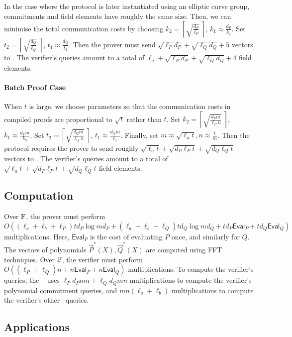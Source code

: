 In the case where the protocol is later instantiated using an elliptic curve group, commitments and field elements have roughly the same size. Then, we can minimise the total communication costs by choosing $k_2 =\left\lceil \sqrt{\frac{d_P }{\ell_P }} ~\right\rceil$, $k_1 \approx \frac{d_P }{k_2}$. Set $t_2= \left\lceil \sqrt{\frac{d_Q}{\ell_Q}} ~\right\rceil$, $t_1 \approx \frac{d_Q }{t_2}$. Then the prover must send $\sqrt{\ell_P d_P}+\sqrt{\ell_Q d_Q} + 5$ vectors to \ILC. The verifier's queries amount to a total of $\ell_a + \sqrt{\ell_P d_P}+\sqrt{\ell_Q d_Q} + 4$ field elements. 

\paragraph{Batch Proof Case} When $t$ is large, we choose parameters so that the communication costs in compiled proofs are proportional to $\sqrt{t}$ rather than $t$. Set $k_2 =\left\lceil \sqrt{\frac{d_P m}{\ell_P n}} ~\right\rceil$, $k_1 \approx \frac{d_P m}{k_2}$. Set $t_2 =\left\lceil \sqrt{\frac{d_Q m}{\ell_Q n}} ~\right\rceil$, $t_1 \approx \frac{d_Q m}{t_2}$. Finally, set $m \approx \sqrt{\ell_a t}, n \approx \frac{t}{m}$. Then the protocol requires the prover to send roughly $\sqrt{\ell_a t} + \sqrt{d_P \ell_P t} + \sqrt{d_Q \ell_Q t}$ vectors to \ILC. The verifier's queries amount to a total of $\sqrt{\ell_a t} + \sqrt{d_P \ell_P t} + \sqrt{d_Q \ell_Q t}$ field elements.

\subsection{Computation} 
Over $\mathbb{F}$, the prover must perform$$O( (\ell_a+\ell_b+\ell_P) td_P \log md_P +(\ell_a+\ell_b+\ell_Q) td_Q \log md_Q + td_P \mathsf{Eval}_P+td_Q \mathsf{Eval}_Q)$$ multiplications. Here, $\mathsf{Eval}_P$ is the cost of evaluating $P$ once, and similarly for $Q$. The vectors of polynomials $\vec{P}^*(X),\vec{Q}^*(X)$ are computed using FFT techniques.
Over $\mathbb{F}$, the verifier must perform $O( (\ell_P+\ell_Q)n +  n\mathsf{Eval}_P+n \mathsf{Eval}_Q)$ multiplications. To compute the verifier's queries, the \ILC~ uses $\ell_P d_P mn + \ell_Q d_Q mn$ multiplications to compute the verifier's polynomial commitment queries, and $mn(\ell_a+\ell_b)$ multiplications to compute the verifier's other \ILC\ queries.

\subsection{Applications}


